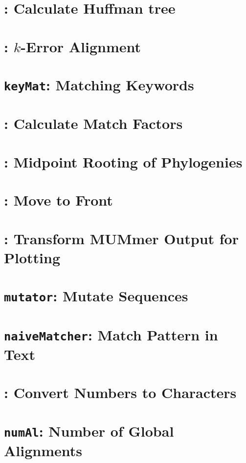 \documentclass[a4paper]{book}
\begin{document}
\chapter{: Calculate Huffman tree}\label{ch:hut}

\chapter{: $k$-Error Alignment}\label{ch:ke}

\chapter{\texttt{keyMat}: Matching Keywords}\label{ch:km}

\chapter{: Calculate Match Factors}\label{ch:ma}

\chapter{: Midpoint Rooting of
  Phylogenies}\label{ch:mr}

\chapter{: Move to Front}\label{ch:mt}

\chapter{: Transform MUMmer Output for
  Plotting}\label{ch:m2p}

\chapter{\texttt{mutator}: Mutate Sequences}\label{ch:mut}

\chapter{\texttt{naiveMatcher}: Match Pattern in
  Text}\label{ch:nm}

\chapter{: Convert Numbers to Characters}\label{ch:n2c}

\chapter{\texttt{numAl}: Number of Global
  Alignments}\label{ch:num}

\end{document}
